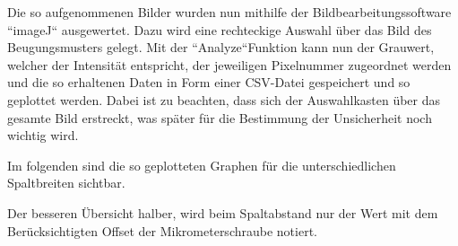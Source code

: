 \documentclass[11pt,ngerman]{scrartcl}
\begin{document}
\noindent Die so aufgenommenen Bilder wurden nun mithilfe der Bildbearbeitungssoftware ``imageJ`` ausgewertet. Dazu wird eine rechteckige Auswahl über das Bild des Beugungsmusters gelegt. Mit der ``Analyze``Funktion kann nun der Grauwert, welcher der Intensität entspricht, der jeweiligen Pixelnummer zugeordnet werden und die so erhaltenen Daten in Form einer CSV-Datei gespeichert und so geplottet werden. Dabei ist zu beachten, dass sich der Auswahlkasten über das gesamte Bild erstreckt, was später für die Bestimmung der Unsicherheit noch wichtig wird.

\vspace{2mm}

\noindent Im folgenden sind die so geplotteten Graphen für die unterschiedlichen Spaltbreiten sichtbar.

\noindent Der besseren Übersicht halber, wird beim Spaltabstand nur der Wert mit dem Berücksichtigten Offset der Mikrometerschraube notiert.

\vspace{2mm}
\end{document}
